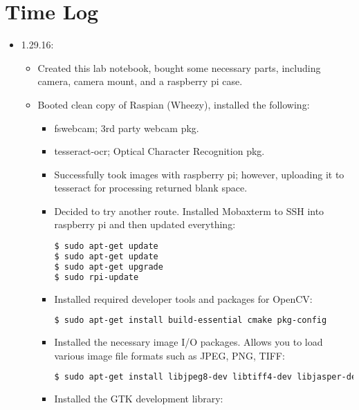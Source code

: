 \documentclass[journal, a4paper]{IEEEtran}
\begin{document}
\section{Time Log}
\begin{itemize}
	\item 1.29.16:
	\begin{itemize}
    	\item Created this lab notebook, bought some necessary parts, including camera, camera mount, and a raspberry pi case.
        \item Booted clean copy of Raspian (Wheezy), installed the following:
        \begin{itemize}
			\item fswebcam; 3rd party webcam pkg.
            \item tesseract-ocr; Optical Character Recognition pkg.
            \item Successfully took images with raspberry pi; however, uploading it to tesseract for processing returned blank space. 
            \item Decided to try another route. Installed Mobaxterm to SSH into raspberry pi and then updated everything:
            \begin{lstlisting}[language=bash]
$ sudo apt-get update
$ sudo apt-get update
$ sudo apt-get upgrade
$ sudo rpi-update
			\end{lstlisting}
            \item Installed required developer tools and packages for OpenCV:
             \begin{lstlisting}[language=bash]
$ sudo apt-get install build-essential cmake pkg-config
			\end{lstlisting}
            \item Installed the necessary image I/O packages. Allows you to load various image file formats such as JPEG, PNG, TIFF:
            \begin{lstlisting}[language=bash]
$ sudo apt-get install libjpeg8-dev libtiff4-dev libjasper-dev libpng12-dev
			\end{lstlisting}
            \item Installed the GTK development library:
            \begin{lstlisting}[language=bash]

\end{lstlisting}
\end{itemize}
\end{itemize}
\end{itemize}
\end{document}

